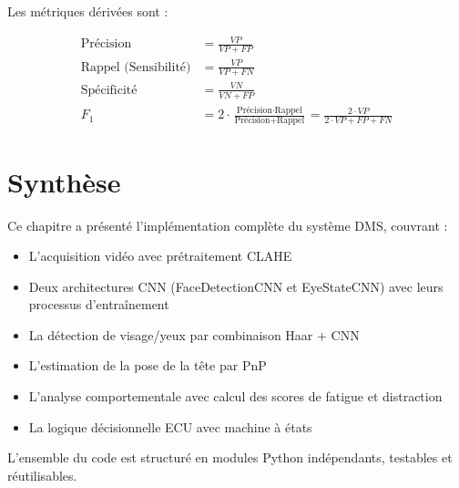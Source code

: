 Les métriques dérivées sont :

\begin{align}
\text{Précision} &= \frac{VP}{VP + FP} \label{eq:precision} \\
\text{Rappel (Sensibilité)} &= \frac{VP}{VP + FN} \label{eq:recall} \\
\text{Spécificité} &= \frac{VN}{VN + FP} \label{eq:specificity} \\
F_1 &= 2 \cdot \frac{\text{Précision} \cdot \text{Rappel}}{\text{Précision} + \text{Rappel}} = \frac{2 \cdot VP}{2 \cdot VP + FP + FN} \label{eq:f1}
\end{align}

\section{Synthèse}

Ce chapitre a présenté l'implémentation complète du système DMS, couvrant :
\begin{itemize}
    \item L'acquisition vidéo avec prétraitement CLAHE
    \item Deux architectures CNN (FaceDetectionCNN et EyeStateCNN) avec leurs processus d'entraînement
    \item La détection de visage/yeux par combinaison Haar + CNN
    \item L'estimation de la pose de la tête par PnP
    \item L'analyse comportementale avec calcul des scores de fatigue et distraction
    \item La logique décisionnelle ECU avec machine à états
\end{itemize}

L'ensemble du code est structuré en modules Python indépendants, testables et réutilisables.
